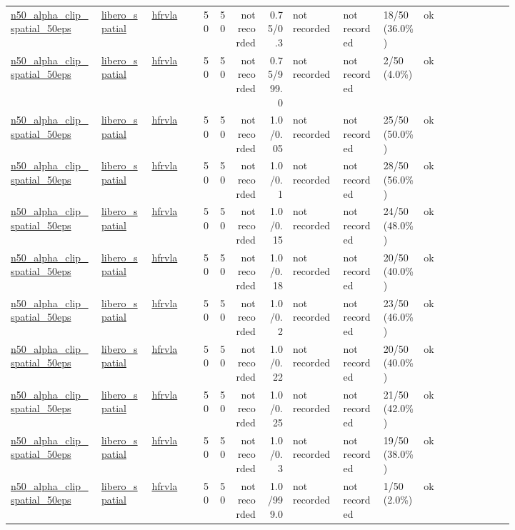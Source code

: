 \begin{tiny}
\begin{longtable}{@{}p{0.18\linewidth}p{0.10\linewidth}p{0.10\linewidth}rrrrp{0.10\linewidth}p{0.08\linewidth}p{0.08\linewidth}p{0.11\linewidth}p{0.07\linewidth}@{}}
\url{n50_alpha_clip_spatial_50eps} & \url{libero_spatial} & \url{hfrvla} & 50 & 50 & not recorded & 0.75/0.3 & not recorded & not recorded & 18/50 (36.0\%) & ok \\
\url{n50_alpha_clip_spatial_50eps} & \url{libero_spatial} & \url{hfrvla} & 50 & 50 & not recorded & 0.75/999.0 & not recorded & not recorded & 2/50 (4.0\%) & ok \\
\url{n50_alpha_clip_spatial_50eps} & \url{libero_spatial} & \url{hfrvla} & 50 & 50 & not recorded & 1.0/0.05 & not recorded & not recorded & 25/50 (50.0\%) & ok \\
\url{n50_alpha_clip_spatial_50eps} & \url{libero_spatial} & \url{hfrvla} & 50 & 50 & not recorded & 1.0/0.1 & not recorded & not recorded & 28/50 (56.0\%) & ok \\
\url{n50_alpha_clip_spatial_50eps} & \url{libero_spatial} & \url{hfrvla} & 50 & 50 & not recorded & 1.0/0.15 & not recorded & not recorded & 24/50 (48.0\%) & ok \\
\url{n50_alpha_clip_spatial_50eps} & \url{libero_spatial} & \url{hfrvla} & 50 & 50 & not recorded & 1.0/0.18 & not recorded & not recorded & 20/50 (40.0\%) & ok \\
\url{n50_alpha_clip_spatial_50eps} & \url{libero_spatial} & \url{hfrvla} & 50 & 50 & not recorded & 1.0/0.2 & not recorded & not recorded & 23/50 (46.0\%) & ok \\
\url{n50_alpha_clip_spatial_50eps} & \url{libero_spatial} & \url{hfrvla} & 50 & 50 & not recorded & 1.0/0.22 & not recorded & not recorded & 20/50 (40.0\%) & ok \\
\url{n50_alpha_clip_spatial_50eps} & \url{libero_spatial} & \url{hfrvla} & 50 & 50 & not recorded & 1.0/0.25 & not recorded & not recorded & 21/50 (42.0\%) & ok \\
\url{n50_alpha_clip_spatial_50eps} & \url{libero_spatial} & \url{hfrvla} & 50 & 50 & not recorded & 1.0/0.3 & not recorded & not recorded & 19/50 (38.0\%) & ok \\
\url{n50_alpha_clip_spatial_50eps} & \url{libero_spatial} & \url{hfrvla} & 50 & 50 & not recorded & 1.0/999.0 & not recorded & not recorded & 1/50 (2.0\%) & ok \\
\end{longtable}
\end{tiny}
